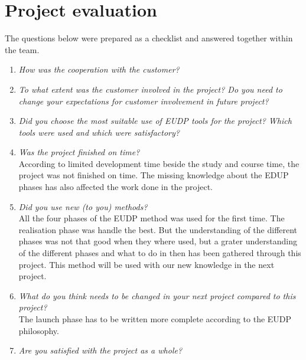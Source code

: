 \section{Project evaluation}
The questions below were prepared as a checklist and answered together within the team.
\begin{enumerate}
\item \textit{How was the cooperation with the customer?}\\
		
\item \textit{To what extent was the customer involved in the project? Do you need to change your expectations for customer involvement in future project?}\\
		
\item \textit{Did you choose the most suitable use of EUDP tools for the project? Which tools were used and which were satisfactory?}\\
		
\item \textit{Was the project finished on time?}\\
		According to limited development time beside the study and course time, the project was not finished on time. The missing knowledge about the EDUP phases has also affected the work done in the project.
\item \textit{Did you use new (to you) methods?}\\
		All the four phases of the EUDP method was used for the first time. The realisation phase was handle the best. But the understanding of the different phases was not that good when they where used, but a grater understanding of the different phases and what to do in then has been gathered through this project. This method will be used with our new knowledge in the next project.
\item \textit{What do you think needs to be changed in your next project compared to this project?}\\
		The launch phase has to be written more complete according to the EUDP philosophy.
\item \textit{Are you satisfied with the project as a whole?} \\
		
\end{enumerate}